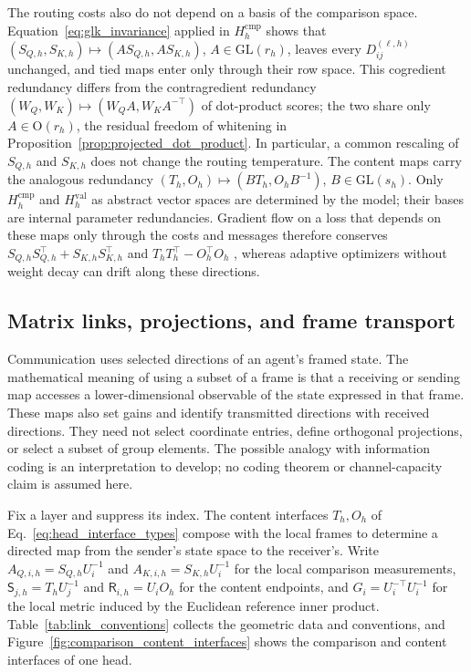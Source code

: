 \documentclass[twoside,11pt]{article}
\begin{document}
The routing costs also do not depend on a basis of the comparison space. Equation~\eqref{eq:glk_invariance} applied in \(H_h^{\mathrm{cmp}}\) shows that \((S_{Q,h},S_{K,h})\mapsto(AS_{Q,h},AS_{K,h})\), \(A\in\mathrm{GL}(r_h)\), leaves every \(D_{ij}^{(\ell,h)}\) unchanged, and tied maps enter only through their row space. This cogredient redundancy differs from the contragredient redundancy \((W_Q,W_K)\mapsto(W_QA,W_KA^{-\top})\) of dot-product scores; the two share only \(A\in\mathrm O(r_h)\), the residual freedom of whitening in Proposition~\ref{prop:projected_dot_product}. In particular, a common rescaling of \(S_{Q,h}\) and \(S_{K,h}\) does not change the routing temperature. The content maps carry the analogous redundancy \((T_h,O_h)\mapsto(BT_h,O_hB^{-1})\), \(B\in\mathrm{GL}(s_h)\). Only \(H_h^{\mathrm{cmp}}\) and \(H_h^{\mathrm{val}}\) as abstract vector spaces are determined by the model; their bases are internal parameter redundancies. Gradient flow on a loss that depends on these maps only through the costs and messages therefore conserves \(S_{Q,h}S_{Q,h}^\top+S_{K,h}S_{K,h}^\top\) and \(T_hT_h^\top-O_h^\top O_h\) \citep{du2018balanced,Kunin2021NeuralMechanics}, whereas adaptive optimizers without weight decay can drift along these directions.


\subsection{Matrix links, projections, and frame transport}
\label{sec:matrix_link_fields}

Communication uses selected directions of an agent's framed state. The mathematical meaning of using a subset of a frame is that a receiving or sending map accesses a lower-dimensional observable of the state expressed in that frame. These maps also set gains and identify transmitted directions with received directions. They need not select coordinate entries, define orthogonal projections, or select a subset of group elements. The possible analogy with information coding is an interpretation to develop; no coding theorem or channel-capacity claim is assumed here.

Fix a layer and suppress its index. The content interfaces \(T_h,O_h\) of Eq.~\eqref{eq:head_interface_types} compose with the local frames to determine a directed map from the sender's state space to the receiver's. Write \(A_{Q,i,h}=S_{Q,h}U_i^{-1}\) and \(A_{K,i,h}=S_{K,h}U_i^{-1}\) for the local comparison measurements, \(\mathsf S_{j,h}=T_hU_j^{-1}\) and \(\mathsf R_{i,h}=U_iO_h\) for the content endpoints, and \(G_i=U_i^{-\top}U_i^{-1}\) for the local metric induced by the Euclidean reference inner product. Table~\ref{tab:link_conventions} collects the geometric data and conventions, and Figure~\ref{fig:comparison_content_interfaces} shows the comparison and content interfaces of one head.
\end{document}
